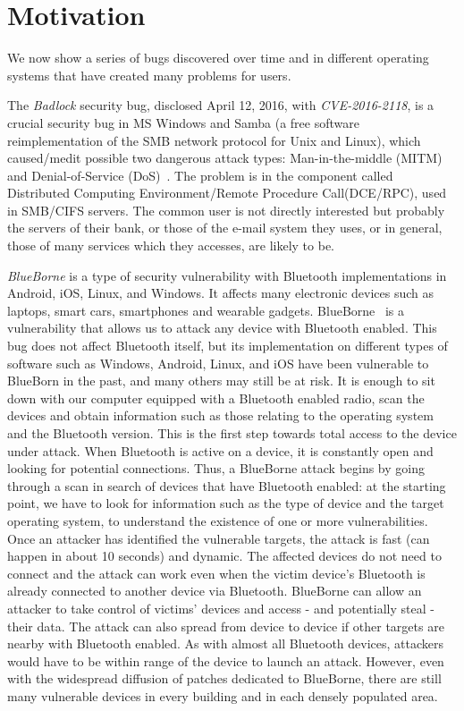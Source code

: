 \documentclass{masterthesis}
\begin{document}
\section{Motivation}
\label{sect:motiv}
We now show a series of bugs discovered over time and in different operating systems that have created many problems for users.

The \emph{Badlock} security bug, disclosed April 12, 2016, with \textit{CVE-2016-2118}, is a crucial security bug in MS Windows and Samba (a free software reimplementation of the SMB network protocol for Unix and Linux), which caused/medit possible two dangerous attack types: Man-in-the-middle (MITM)~\cite{conti2016survey} and Denial-of-Service (DoS)~\cite{lau2000distributed}.
The problem is in the component called Distributed Computing Environment/Remote Procedure Call(DCE/RPC), used in SMB/CIFS servers.
The common user is not directly interested but probably the servers of their bank, or those of the e-mail system they uses, or in general, those of many services which they accesses, are likely to be.

\emph{BlueBorne} is a type of security vulnerability with Bluetooth implementations in Android, iOS, Linux, and Windows. It affects many electronic devices such as laptops, smart cars, smartphones and wearable gadgets.
BlueBorne~\cite{bour2018bluetooth} is a vulnerability that allows us to attack any device with Bluetooth enabled. This bug does not affect Bluetooth itself, but its implementation on different types of software such as Windows, Android, Linux, and iOS have been vulnerable to BlueBorn in the past, and many others may still be at risk.
It is enough to sit down with our computer equipped with a Bluetooth enabled radio, scan the devices and obtain information such as those relating to the operating system and the Bluetooth version. This is the first step towards total access to the device under attack.
When Bluetooth is active on a device, it is constantly open and looking for potential connections. Thus, a BlueBorne attack begins by going through a scan in search of devices that have Bluetooth enabled: at the starting point, we have to look for information such as the type of device and the target operating system, to understand the existence of one or more vulnerabilities. Once an attacker has identified the vulnerable targets, the attack is fast (can happen in about 10 seconds) and dynamic. The affected devices do not need to connect and the attack can work even when the victim device's Bluetooth is already connected to another device via Bluetooth.
BlueBorne can allow an attacker to take control of victims' devices and access - and potentially steal - their data. The attack can also spread from device to device if other targets are nearby with Bluetooth enabled. As with almost all Bluetooth devices, attackers would have to be within range of the device to launch an attack. However, even with the widespread diffusion of patches dedicated to BlueBorne, there are still many vulnerable devices in every building and in each densely populated area.
\end{document}
